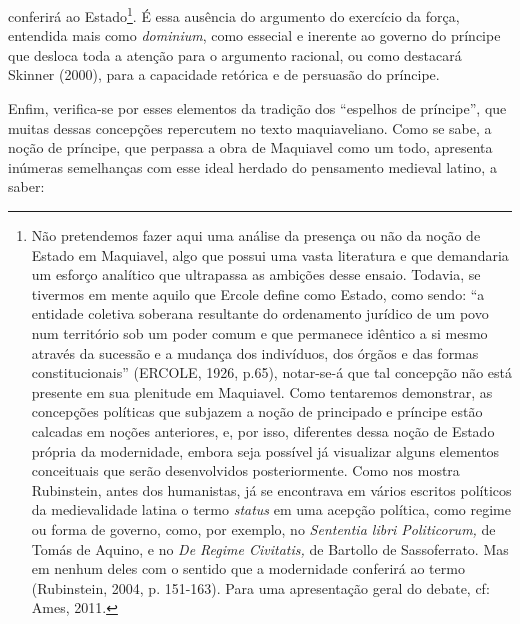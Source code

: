 conferirá ao Estado\footnote{Não pretendemos fazer aqui uma análise da
  presença ou não da noção de Estado em Maquiavel, algo que possui uma
  vasta literatura e que demandaria um esforço analítico que ultrapassa
  as ambições desse ensaio. Todavia, se tivermos em mente aquilo que
  Ercole define como Estado, como sendo: ``a entidade coletiva soberana
  resultante do ordenamento jurídico de um povo num território sob um
  poder comum e que permanece idêntico a si mesmo através da sucessão e
  a mudança dos indivíduos, dos órgãos e das formas constitucionais''
  (ERCOLE, 1926, p.65), notar-se-á que tal concepção não está presente
  em sua plenitude em Maquiavel. Como tentaremos demonstrar, as
  concepções políticas que subjazem a noção de principado e príncipe
  estão calcadas em noções anteriores, e, por isso, diferentes dessa
  noção de Estado própria da modernidade, embora seja possível já
  visualizar alguns elementos conceituais que serão desenvolvidos
  posteriormente. Como nos mostra Rubinstein, antes dos humanistas, já
  se encontrava em vários escritos políticos da medievalidade latina o
  termo \emph{status} em uma acepção política, como regime ou forma de
  governo, como, por exemplo, no \emph{Sententia libri Politicorum,} de
  Tomás de Aquino, e no \emph{De Regime Civitatis,} de Bartollo de
  Sassoferrato. Mas em nenhum deles com o sentido que a modernidade
  conferirá ao termo (Rubinstein, 2004, p. 151-163). Para uma
  apresentação geral do debate, cf: Ames, 2011.}. É essa ausência do
argumento do exercício da força, entendida mais como \emph{dominium},
como essecial e inerente ao governo do príncipe que desloca toda a
atenção para o argumento racional, ou como destacará Skinner (2000),
para a capacidade retórica e de persuasão do príncipe.

Enfim, verifica-se por esses elementos da tradição dos ``espelhos de
príncipe'', que muitas dessas concepções repercutem no texto
maquiaveliano. Como se sabe, a noção de príncipe, que perpassa a obra de
Maquiavel como um todo, apresenta inúmeras semelhanças com esse ideal
herdado do pensamento medieval latino, a saber:

